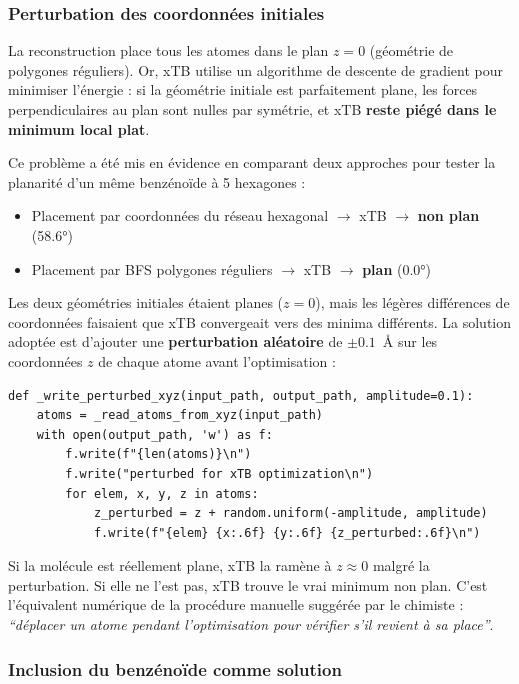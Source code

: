 \subsubsection{Perturbation des coordonnées initiales}

La reconstruction place tous les atomes dans le plan $z = 0$ (géométrie de polygones
réguliers). Or, xTB utilise un algorithme de descente de gradient pour minimiser l'énergie :
si la géométrie initiale est parfaitement plane, les forces perpendiculaires au plan sont
nulles par symétrie, et xTB \textbf{reste piégé dans le minimum local plat}.

Ce problème a été mis en évidence en comparant deux approches pour tester la planarité d'un
même benzénoïde à 5 hexagones :
\begin{itemize}
  \item Placement par coordonnées du réseau hexagonal $\to$ xTB $\to$ \textbf{non plan} (58.6°)
  \item Placement par BFS polygones réguliers $\to$ xTB $\to$ \textbf{plan} (0.0°)
\end{itemize}

Les deux géométries initiales étaient planes ($z = 0$), mais les légères différences de
coordonnées faisaient que xTB convergeait vers des minima différents. La solution adoptée
est d'ajouter une \textbf{perturbation aléatoire} de $\pm 0.1$~\AA{} sur les coordonnées $z$
de chaque atome avant l'optimisation :

\begin{lstlisting}
def _write_perturbed_xyz(input_path, output_path, amplitude=0.1):
    atoms = _read_atoms_from_xyz(input_path)
    with open(output_path, 'w') as f:
        f.write(f"{len(atoms)}\n")
        f.write("perturbed for xTB optimization\n")
        for elem, x, y, z in atoms:
            z_perturbed = z + random.uniform(-amplitude, amplitude)
            f.write(f"{elem} {x:.6f} {y:.6f} {z_perturbed:.6f}\n")
\end{lstlisting}

Si la molécule est réellement plane, xTB la ramène à $z \approx 0$ malgré la perturbation.
Si elle ne l'est pas, xTB trouve le vrai minimum non plan. C'est l'équivalent numérique de la
procédure manuelle suggérée par le chimiste : \textit{``déplacer un atome pendant l'optimisation
pour vérifier s'il revient à sa place''}.

\subsubsection{Inclusion du benzénoïde comme solution}

